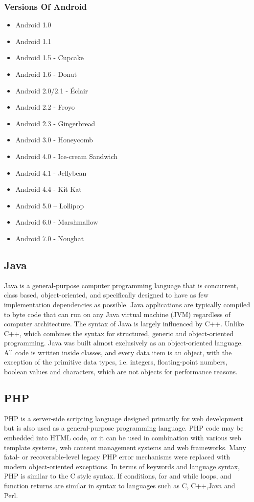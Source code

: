 \documentclass[12pt,a4paper,oneside]{report}
\begin{document}
\subsubsection{Versions Of Android}
\begin{itemize} 
\item Android 1.0
\item	Android 1.1
\item	Android 1.5 - Cupcake
\item	Android 1.6 - Donut
\item	Android 2.0/2.1 - Éclair
\item	Android 2.2 - Froyo
\item	Android 2.3 - Gingerbread
\item	Android 3.0 - Honeycomb
\item	Android 4.0 - Ice-cream Sandwich
\item	Android 4.1 - Jellybean
\item	Android 4.4 - Kit Kat
\item	Android 5.0 – Lollipop
\item	Android 6.0 - Marshmallow
\item	Android 7.0 - Noughat

\end{itemize}


\subsection{Java}
Java is a general-purpose computer programming language that is concurrent, class based,
object-oriented, and specifically designed to have as few implementation dependencies
as possible. Java applications are typically compiled to byte code that can run on any Java
virtual machine (JVM) regardless of computer architecture. The syntax of Java is largely influenced
by C++. Unlike C++, which combines the syntax for structured, generic and object-oriented
programming. Java was built almost exclusively as an object-oriented language. All
code is written inside classes, and every data item is an object, with the exception of the primitive
data types, i.e. integers, floating-point numbers, boolean values and characters, which are
not objects for performance reasons.
\subsection{PHP}
PHP is a server-side scripting language designed primarily for web development but
is also used as a general-purpose programming language. PHP code may be embedded into
HTML code, or it can be used in combination with various web template systems, web content
management systems and web frameworks. Many fatal- or recoverable-level legacy PHP error
mechanisms were replaced with modern object-oriented exceptions. In terms of keywords and
language syntax, PHP is similar to the C style syntax. If conditions, for and while loops, and
function returns are similar in syntax to languages such as C, C++,Java and Perl.
\end{document}
